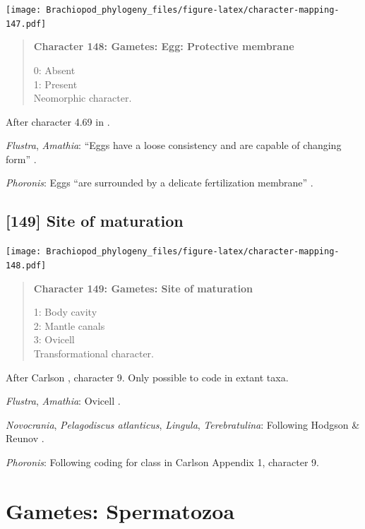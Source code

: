 \documentclass[openany]{book}
\begin{document}
\texttt{[image: Brachiopod\_phylogeny\_files/figure-latex/character-mapping-147.pdf]}

\begin{quote}
\textbf{Character 148: Gametes: Egg: Protective membrane}

0: Absent\\
1: Present\\
Neomorphic character.
\end{quote}

After character 4.69 in \citet{SPS1996}.

\hypertarget{Amathia-coding-148}{}
\emph{Flustra}, \emph{Amathia}: ``Eggs have a loose consistency and are
capable of changing form'' \citep{Franzen1977}.

\hypertarget{Phoronis-coding-148}{}
\emph{Phoronis}: Eggs ``are surrounded by a delicate fertilization
membrane'' \citep{Pennerstorfer2012}.

\subsection*{{[}149{]} Site of maturation}\label{site-of-maturation}

\texttt{[image: Brachiopod\_phylogeny\_files/figure-latex/character-mapping-148.pdf]}

\begin{quote}
\textbf{Character 149: Gametes: Site of maturation}

1: Body cavity\\
2: Mantle canals\\
3: Ovicell\\
Transformational character.
\end{quote}

After Carlson \citeyearpar{Carlson1995Phylogeneticrelationships},
character 9. Only possible to code in extant taxa.

\hypertarget{Amathia-coding-149}{}
\emph{Flustra}, \emph{Amathia}: Ovicell \citep{Franzen1977}.

\hypertarget{Lingula-coding-149}{}
\emph{Novocrania}, \emph{Pelagodiscus atlanticus}, \emph{Lingula},
\emph{Terebratulina}: Following Hodgson \& Reunov
\citeyearpar{Hodgson1994Ultrastructureof}.

\hypertarget{Phoronis-coding-149}{}
\emph{Phoronis}: Following coding for class in Carlson
\citeyearpar{Carlson1995Phylogeneticrelationships} Appendix 1, character
9.

\section{Gametes: Spermatozoa}\label{gametes-spermatozoa}
\end{document}
